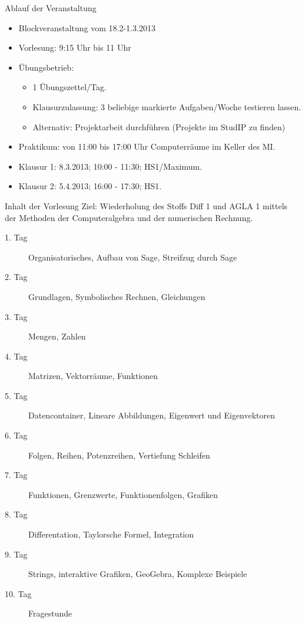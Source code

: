 \documentclass[hyperref={xetex}]{beamer}
\begin{document}
\begin{frame}{Ablauf der Veranstaltung}
\begin{itemize}
\item Blockveranstaltung vom  18.2-1.3.2013
\item \alert{Vorlesung:} 9:15 Uhr bis 11 Uhr
\item \alert{Übungsbetrieb:}
\begin{itemize}
\item 1 Übungszettel/Tag.
\item Klausurzulassung: 3 beliebige markierte Aufgaben/Woche testieren lassen. 
\item Alternativ: Projektarbeit durchführen (Projekte im StudIP zu finden)
\end{itemize}
\item \alert{Praktikum:} von 11:00 bis 17:00 Uhr Computerräume im Keller des MI.
\item \alert{Klausur 1:} 8.3.2013; 10:00 - 11:30; HS1/Maximum.
\item \alert{Klausur 2:} 5.4.2013; 16:00 - 17:30; HS1.
\end{itemize}
\end{frame}

\begin{frame}{Inhalt der Vorlesung}
\alert{Ziel:} Wiederholung des Stoffs Diff 1 und AGLA 1 mittels der Methoden der Computeralgebra und der numerischen Rechnung.
\begin{description}
 \item[1. Tag]Organisatorisches, Aufbau von Sage, Streifzug durch Sage
\item [2. Tag] Grundlagen, Symbolisches Rechnen, Gleichungen
\item [3. Tag] Mengen, Zahlen
\item [4. Tag] Matrizen, Vektorräume, Funktionen
\item [5. Tag] Datencontainer, Lineare Abbildungen, Eigenwert und Eigenvektoren
\item [6. Tag] Folgen, Reihen, Potenzreihen, Vertiefung Schleifen
\item [7. Tag] Funktionen, Grenzwerte, Funktionenfolgen, Grafiken
\item [8. Tag] Differentation, Taylorsche Formel, Integration
\item [9. Tag] Strings, interaktive Grafiken, GeoGebra, Komplexe Beispiele
\item [10. Tag] Fragestunde
\end{description}
\end{frame}
\end{document}
